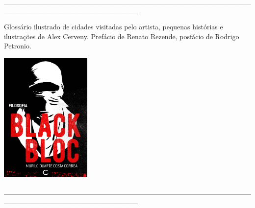 \hspace*{-2cm}\_\_\_\_\_\_\_\_\_\_\_\_\_\_\_\_\_\_\_\_\_\_\_\_\_\_\_\_\_\_\_\_\_\_\_\_\_\_\_\_\_\_\_\_\_\_\_\_\_\_\_\_\_\_\_\_\_\_\_\_\_\_\_\_\_\_\_\_\_\_\_\_\_\_

\medskip

\noindent{}Glossário ilustrado de cidades visitadas pelo artista, pequenas histórias e ilustrações de Alex Cerveny. Prefácio de Renato Rezende, posfácio de Rodrigo Petronio.

\vfill

\hspace*{-.4cm}\begin{minipage}[c]{0.90\linewidth}
\small{
{}}
\end{minipage}

\pagebreak

\hspace{.5cm}

\begin{center}
\hspace*{-2.5cm}
\hspace*{2cm}\includegraphics[width=45mm]{./imgs/blackbloc.jpg}
\end{center}

\hspace*{-2cm}\_\_\_\_\_\_\_\_\_\_\_\_\_\_\_\_\_\_\_\_\_\_\_\_\_\_\_\_\_\_\_\_\_\_\_\_\_\_\_\_\_\_\_\_\_\_\_\_\_\_\_\_\_\_\_\_\_\_\_\_\_\_\_\_\_\_\_\_\_\_\_\_\_\_

